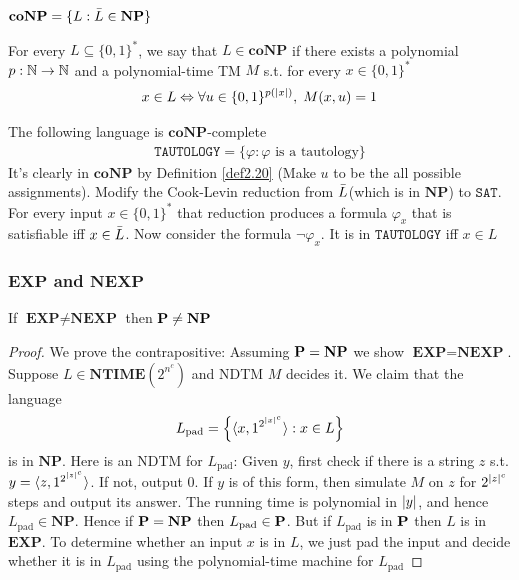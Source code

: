 \documentclass[11pt]{article}
\def \EXP {\textbf{EXP}}
\def \NTIME {\textbf{NTIME}}
\def \NP {\textbf{NP}}
\def \coNP {\textbf{coNP}}
\def \NEXP {\textbf{NEXP}}
\def \SAT {\text{SAT}}
\def \pad {\text{pad}}
\def \NP {\textbf{NP}}
\def \SAT {\texttt{SAT}}
\def \TAUTOLOGY {\texttt{TAUTOLOGY}}
\begin{document}
\begin{definition}[]
\label{def2.19}
\(\coNP=\{L:\barL\in\NP\}\)
\end{definition}

\begin{definition}
\label{def2.20p}
For every \(L\subseteq\{0,1\}^*\), we say that \(L\in\coNP\) if there exists a
polynomial \(p:\mathbb{N}\to\mathbb{N}\) and a polynomial-time TM \(M\) s.t. for every \(x\in\{0,1\}^*\)
     \begin{equation*}
x\in L \Leftrightarrow\forall u\in\{0,1\}^{p(\abs{x})},\; M(x,u)=1
     \end{equation*}
\end{definition}

\begin{examplle}[]
The following language is \(\coNP\)-complete
     \begin{align*}
\TAUTOLOGY=\{\varphi:\varphi\text{ is a tautology}\}
     \end{align*}
It's clearly in \(\coNP\) by Definition \ref{def2.20} (Make \(u\) to be the all possible
assignments). Modify the Cook-Levin reduction 
from \(\bar{L}\)(which is in \(\NP\)) to \(\SAT\). For every input \(x\in\{0,1\}^*\) that
reduction produces a formula \(\varphi_x\) that is satisfiable iff \(x\in\bar{L}\). Now consider
the formula \(\neg\varphi_x\). It is in \(\TAUTOLOGY\) iff \(x\in L\)
\end{examplle}

\subsubsection{\(\EXP\) and \(\NEXP\)}
\label{sec:orgfed85c2}
\begin{theorem}[]
If \(\EXP\neq\NEXP\) then \(\bP\neq\NP\)
\end{theorem}

\begin{proof}
We prove the contrapositive: Assuming \(\bP=\NP\) we show \(\EXP=\NEXP\).
Suppose \(L\in\NTIME(2^{n^c})\) and NDTM \(M\) decides it. We claim that the language
     \begin{equation*}
L_{\pad}=\left\{\la x,1^{2^{\abs{x}^c}}\ra:x\in L
\right\}
     \end{equation*}
is in \(\NP\). Here is an NDTM for \(L_{\pad}\): Given \(y\), first check if there is a
string \(z\) s.t. \(y=\la z,1^{2^{\abs{z}^c}}\ra\). If not, output 0. If \(y\) is of this form,
then simulate \(M\) on \(z\) for \(2^{\abs{z}^c}\) steps and output its answer. The running
time is polynomial in \(\abs{y}\), and hence \(L_{\pad}\in\NP\). Hence if \(\bP=\NP\)
then \(L_{\pad}\in\bP\). But if \(L_{\pad}\) is in \(\operatorname{\textbf{P}}\) then \(L\) is in \(\EXP\). To
determine whether an input \(x\) is in \(L\), we just pad the input and decide whether it is
in \(L_{\pad}\) using the polynomial-time machine for \(L_{\pad}\)
\end{proof}
\end{document}
